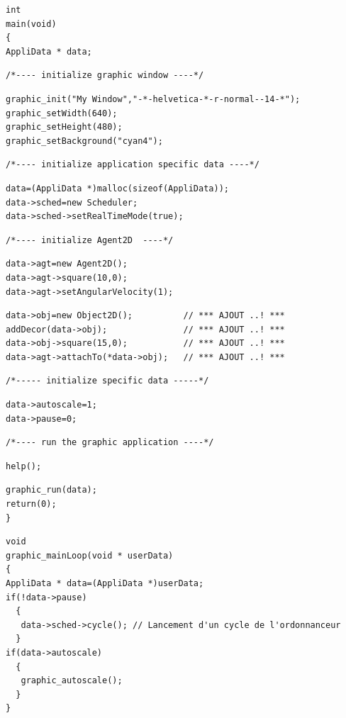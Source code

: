 \documentclass[12pt]{article}
\begin{document}
\begin{small}
\begin{verbatim}
int
main(void)
{
AppliData * data;
\end{verbatim}
\begin{verbatim}
/*---- initialize graphic window ----*/
\end{verbatim}
\begin{verbatim}
graphic_init("My Window","-*-helvetica-*-r-normal--14-*");
graphic_setWidth(640);
graphic_setHeight(480);
graphic_setBackground("cyan4");
\end{verbatim}
\begin{verbatim}
/*---- initialize application specific data ----*/
\end{verbatim}
\begin{verbatim}
data=(AppliData *)malloc(sizeof(AppliData));
data->sched=new Scheduler;
data->sched->setRealTimeMode(true);
\end{verbatim}
\begin{verbatim}
/*---- initialize Agent2D  ----*/
\end{verbatim}
\begin{verbatim}
data->agt=new Agent2D();
data->agt->square(10,0);
data->agt->setAngularVelocity(1);
\end{verbatim}
\begin{verbatim}
data->obj=new Object2D();          // *** AJOUT ..! ***
addDecor(data->obj);               // *** AJOUT ..! ***
data->obj->square(15,0);           // *** AJOUT ..! ***
data->agt->attachTo(*data->obj);   // *** AJOUT ..! ***
\end{verbatim}
\begin{verbatim}
/*----- initialize specific data -----*/
\end{verbatim}
\begin{verbatim}
data->autoscale=1;
data->pause=0;
\end{verbatim}
\begin{verbatim}
/*---- run the graphic application ----*/
\end{verbatim}
\begin{verbatim}
help();
\end{verbatim}
\begin{verbatim}
graphic_run(data);
return(0);
}
\end{verbatim}
\newpage
\begin{verbatim}
void
graphic_mainLoop(void * userData)
{
AppliData * data=(AppliData *)userData;
if(!data->pause)
  {
   data->sched->cycle(); // Lancement d'un cycle de l'ordonnanceur
  }
if(data->autoscale)
  {
   graphic_autoscale();
  }
}
\end{verbatim}

\end{small}
\end{document}

